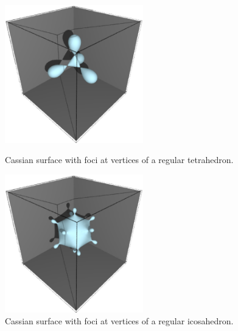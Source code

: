 \documentclass{article}
\begin{document}
\begin{figure}[H]
\begin{minipage}{.5\hsize}
\begin{center}
\includegraphics[width=6cm]{images/tetrahedral_cassini.eps}
\caption{Cassian surface with foci at vertices of a regular tetrahedron.}
\label{}
\end{center}
\end{minipage}
\begin{minipage}{0.5\hsize}
\begin{center}
\includegraphics[width=6cm]{images/icosahedral_cassini.eps}
\caption{Cassian surface with foci at vertices of a regular icosahedron.}
\label{}
\end{center}
\end{minipage}
\end{figure}
\end{document}
